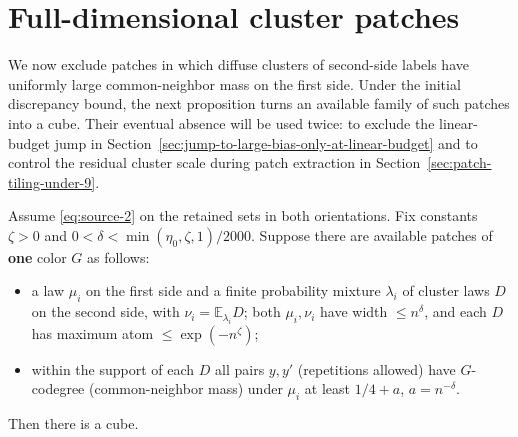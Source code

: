 \section{Full-dimensional cluster patches}
\label{sec:full-dimensional-cluster-patches}

We now exclude patches in which diffuse clusters of second-side labels have
uniformly large common-neighbor mass on the first side. Under the initial
discrepancy bound, the next proposition turns an available family of such
patches into a cube. Their eventual absence will be used twice: to exclude
the linear-budget jump in Section~\ref{sec:jump-to-large-bias-only-at-linear-budget}
and to control the residual cluster scale during patch extraction in
Section~\ref{sec:patch-tiling-under-9}.

\begin{proposition}\label{prop:full-dimensional-cluster-exclusion}
Assume \eqref{eq:source-2} on the retained sets in both orientations. Fix constants \(\zeta>0\) and \(0<\delta<\min(\eta_0,\zeta,1)/2000\). Suppose there are available patches of \textbf{one} color \(G\) as follows:
\begin{itemize}
\item a law \(\mu_i\) on the first side and a finite probability mixture \(\lambda_i\) of cluster laws \(D\) on the second side, with \(\nu_i=\mathbb E_{\lambda_i}D\); both \(\mu_i,\nu_i\) have width \(\le n^\delta\), and each \(D\) has maximum atom \(\le \exp(-n^\zeta)\);
\item within the support of each \(D\) all pairs \(y,y'\) (repetitions allowed) have \(G\)-codegree (common-neighbor mass) under \(\mu_i\) at least \(1/4+a\), \(a=n^{-\delta}\).
\end{itemize}

Then there is a cube.
\end{proposition}

